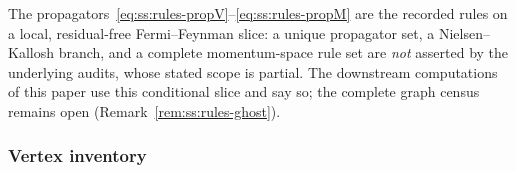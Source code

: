 \begin{remark}\label{rem:ss:rules-slice}
The propagators~\eqref{eq:ss:rules-propV}--\eqref{eq:ss:rules-propM} are the recorded rules on a local, residual-free Fermi--Feynman slice: a unique propagator set, a Nielsen--Kallosh branch, and a complete momentum-space rule set are \emph{not} asserted by the underlying audits, whose stated scope is partial. The downstream computations of this paper use this conditional slice and say so; the complete graph census remains open (Remark~\ref{rem:ss:rules-ghost}).
\end{remark}

\subsubsection*{Vertex inventory}

